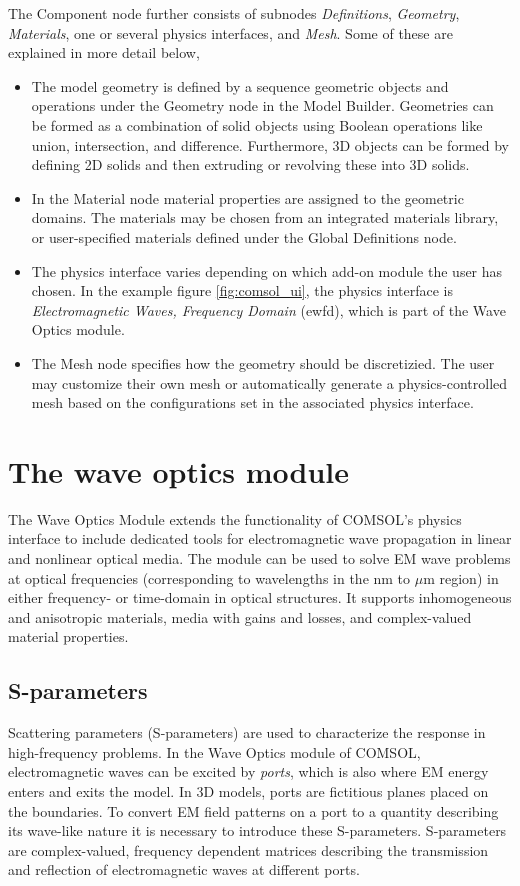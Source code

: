 The Component node further consists of subnodes \emph{Definitions}, \emph{Geometry}, \emph{Materials}, one or several physics interfaces, and \emph{Mesh}. Some of these are explained in more detail below,
\begin{itemize}
    \item The model geometry is defined by a sequence geometric objects and operations under the Geometry node in the Model Builder. Geometries can be formed as a combination of solid objects using Boolean operations like union, intersection, and difference. Furthermore, 3D objects can be formed by defining 2D solids and then extruding or revolving these into 3D solids.
    \item In the Material node material properties are assigned to the geometric domains. The materials may be chosen from an integrated materials library, or user-specified materials defined under the Global Definitions node.
    \item The physics interface varies depending on which add-on module the user has chosen. In the example figure \ref{fig:comsol_ui}, the physics interface is \emph{Electromagnetic Waves, Frequency Domain} (\ac{ewfd}), which is part of the Wave Optics module.
    \item The Mesh node specifies how the geometry should be discretizied. The user may customize their own mesh or automatically generate a physics-controlled mesh based on the configurations set in the associated physics interface.
\end{itemize}

\section{The wave optics module}
The Wave Optics Module extends the functionality of COMSOL's physics interface to include dedicated tools for electromagnetic wave propagation in linear and nonlinear optical media. The module can be used to 
solve EM wave problems at optical frequencies (corresponding to wavelengths in the nm to $\mu$m region) in either frequency- or time-domain in optical structures. It supports inhomogeneous and anisotropic materials, media with gains and losses, and complex-valued material properties. 



\subsection{S-parameters}
Scattering parameters (S-parameters) are used to characterize the response in high-frequency problems.
In the Wave Optics module of COMSOL, electromagnetic waves can be excited by \emph{ports}, which is also where EM energy enters and exits the model. In 3D models, ports are fictitious planes placed on the boundaries. To convert EM field patterns on a port to a quantity describing its wave-like nature it is necessary to introduce these S-parameters. S-parameters are complex-valued, frequency dependent matrices describing the transmission and reflection of electromagnetic waves at different ports. 


